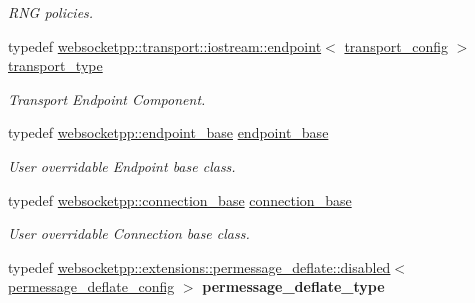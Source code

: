 \begin{DoxyCompactItemize}
\begin{DoxyCompactList}\small\item\em R\+NG policies. \end{DoxyCompactList}\item 
typedef \hyperlink{classwebsocketpp_1_1transport_1_1iostream_1_1endpoint}{websocketpp\+::transport\+::iostream\+::endpoint}$<$ \hyperlink{structwebsocketpp_1_1config_1_1core__client_1_1transport__config}{transport\+\_\+config} $>$ \hyperlink{structwebsocketpp_1_1config_1_1core__client_a8aafafefe476f36425d0fa2059a4db2a}{transport\+\_\+type}\hypertarget{structwebsocketpp_1_1config_1_1core__client_a8aafafefe476f36425d0fa2059a4db2a}{}\label{structwebsocketpp_1_1config_1_1core__client_a8aafafefe476f36425d0fa2059a4db2a}

\begin{DoxyCompactList}\small\item\em Transport Endpoint Component. \end{DoxyCompactList}\item 
typedef \hyperlink{classwebsocketpp_1_1endpoint__base}{websocketpp\+::endpoint\+\_\+base} \hyperlink{structwebsocketpp_1_1config_1_1core__client_a119692ecc6508696e567430caeb0e798}{endpoint\+\_\+base}\hypertarget{structwebsocketpp_1_1config_1_1core__client_a119692ecc6508696e567430caeb0e798}{}\label{structwebsocketpp_1_1config_1_1core__client_a119692ecc6508696e567430caeb0e798}

\begin{DoxyCompactList}\small\item\em User overridable Endpoint base class. \end{DoxyCompactList}\item 
typedef \hyperlink{classwebsocketpp_1_1connection__base}{websocketpp\+::connection\+\_\+base} \hyperlink{structwebsocketpp_1_1config_1_1core__client_a21e23793ee1a435b3a036166d0d70504}{connection\+\_\+base}\hypertarget{structwebsocketpp_1_1config_1_1core__client_a21e23793ee1a435b3a036166d0d70504}{}\label{structwebsocketpp_1_1config_1_1core__client_a21e23793ee1a435b3a036166d0d70504}

\begin{DoxyCompactList}\small\item\em User overridable Connection base class. \end{DoxyCompactList}\item 
typedef \hyperlink{classwebsocketpp_1_1extensions_1_1permessage__deflate_1_1disabled}{websocketpp\+::extensions\+::permessage\+\_\+deflate\+::disabled}$<$ \hyperlink{structwebsocketpp_1_1config_1_1core__client_1_1permessage__deflate__config}{permessage\+\_\+deflate\+\_\+config} $>$ {\bfseries permessage\+\_\+deflate\+\_\+type}\hypertarget{structwebsocketpp_1_1config_1_1core__client_a3887fabcaf40a720208c69a4604d37d2}{}\label{structwebsocketpp_1_1config_1_1core__client_a3887fabcaf40a720208c69a4604d37d2}

\end{DoxyCompactItemize}

